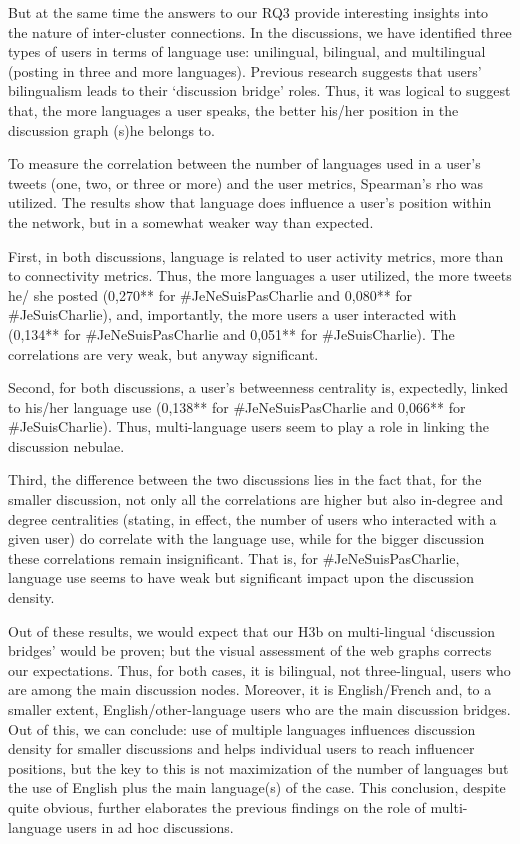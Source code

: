 But at the same time the answers to our RQ3 provide interesting insights into the nature of inter-cluster connections. In the discussions, we have identified three types of users in terms of language use: unilingual, bilingual, and multilingual (posting in three and more languages). Previous research suggests that users’ bilingualism leads to their ‘discussion bridge’ roles. Thus, it was logical to suggest that, the more languages a user speaks, the better his/her position in the discussion graph (s)he belongs to.

To measure the correlation between the number of languages used in a user’s tweets (one, two, or three or more) and the user metrics, Spearman’s rho was utilized. The results show that language does influence a user’s position within the network, but in a somewhat weaker way than expected.

First, in both discussions, language is related to user activity metrics, more than to connectivity metrics. Thus, the more languages a user utilized, the more tweets he/ she posted (0,270** for \#JeNeSuisPasCharlie and 0,080** for \#JeSuisCharlie), and, importantly, the more users a user interacted with (0,134** for \#JeNeSuisPasCharlie and 0,051** for \#JeSuisCharlie). The correlations are very weak, but anyway significant.

Second, for both discussions, a user’s betweenness centrality is, expectedly, linked to his/her language use (0,138** for \#JeNeSuisPasCharlie and 0,066** for \#JeSuisCharlie). Thus, multi-language users seem to play a role in linking the discussion nebulae.

Third, the difference between the two discussions lies in the fact that, for the smaller discussion, not only all the correlations are higher but also in-degree and degree centralities (stating, in effect, the number of users who interacted with a given user) do correlate with the language use, while for the bigger discussion these correlations remain insignificant. That is, for \#JeNeSuisPasCharlie, language use seems to have weak but significant impact upon the discussion density.

Out of these results, we would expect that our H3b on multi-lingual ‘discussion bridges’ would be proven; but the visual assessment of the web graphs corrects our expectations. Thus, for both cases, it is bilingual, not three-lingual, users who are among the main discussion nodes. Moreover, it is English/French and, to a smaller extent, English/other-language users who are the main discussion bridges. Out of this, we can conclude: use of multiple languages influences discussion density for smaller discussions and helps individual users to reach influencer positions, but the key to this is not maximization of the number of languages but the use of English plus the main language(s) of the case. This conclusion, despite quite obvious, further elaborates the previous findings on the role of multi-language users in ad hoc discussions.

